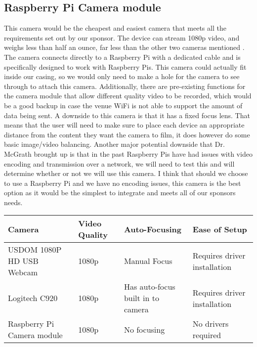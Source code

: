\documentclass[onecolumn, draftclsnofoot,10pt, compsoc]{IEEEtran}
\begin{document}
    \subsection{Raspberry Pi Camera module}
    This camera would be the cheapest and easiest camera that meets all the requirements set out by our sponsor. The device can stream 1080p video, and weighs less than half an ounce, far less than the other two cameras mentioned \cite{IEEEhowto:RaspberryPiModule}. The camera connects directly to a Raspberry Pi with a dedicated cable and is specifically designed to work with Raspberry Pis. This camera could actually fit inside our casing, so we would only need to make a hole for the camera to see through to attach this camera. Additionally, there are pre-existing functions for the camera module that allow different quality video to be recorded, which would be a good backup in case the venue WiFi is not able to support the amount of data being sent. A downside to this camera is that it has a fixed focus lens. That means that the user will need to make sure to place each device an appropriate distance from the content they want the camera to film, it does however do some basic image/video balancing. Another major potential downside that Dr. McGrath brought up is that in the past Raspberry Pis have had issues with video encoding and transmission over a network, we will need to test this and will determine whether or not we will use this camera. I think that should we choose to use a Raspberry Pi and we have no encoding issues, this camera is the best option as it would be the simplest to integrate and meets all of our sponsors needs.
    \newline
    \newline
    \begin{tabular}{|l|p{3cm}|p{4cm}|p{4cm}|}
         \hline
         Camera & Video Quality & Auto-Focusing & Ease of Setup \\ \hline
         
         USDOM 1080P HD USB Webcam & 1080p & Manual Focus  & Requires driver installation \\ \hline
         
         Logitech C920 & 1080p & Has auto-focus built in to camera & Requires driver installation \\ \hline
         
         Raspberry Pi Camera module & 1080p & No focusing & No drivers required \\ \hline
    \end{tabular}
\end{document}
